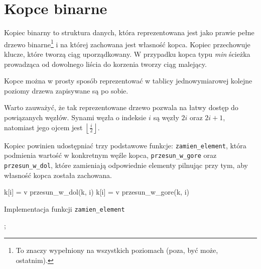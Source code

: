 \chapter{Kopce binarne}

Kopiec binarny to struktura danych, która reprezentowana jest jako prawie pełne drzewo binarne\footnote{To znaczy wypełniony na wszystkich poziomach (poza, być może, ostatnim).} i na której zachowana jest własność kopca. Kopiec przechowuje klucze, które tworzą ciąg uporządkowany. W przypadku kopca typu \emph{min} ścieżka prowadząca od dowolnego liścia do korzenia tworzy ciąg malejący.

Kopce można w prosty sposób reprezentować w tablicy jednowymiarowej \textendash kolejne poziomy drzewa zapisywane są po sobie.


Warto zauważyć, że tak reprezentowane drzewo pozwala na łatwy dostęp do powiązanych węzłów. Synami węzła o indeksie $i$ są węzły $2i$ oraz $2i + 1$, natomiast jego ojcem jest $\left\lfloor \frac{i}{2} \right\rfloor$.

Kopiec powinien udostępniać trzy podstawowe funkcje: \texttt{zamien\_element}, która podmienia wartość w konkretnym węźle kopca, \texttt{przesun\_w\_gore} oraz \texttt{przesun\_w\_dol}, które zamieniają odpowiednie elementy pilnując przy tym, aby własność kopca została zachowana.


\begin{algorithm}[h]
  {
    k[i] = v\;
	przesun\_w\_dol(k, i)\;
  }
  \Else
  {
    k[i] = v\;
	przesun\_w\_gore(k, i)\;
  }  
  \caption{Implementacja funkcji \texttt{zamien\_element}}
  \label{kopiec-zamien-element}
\end{algorithm};